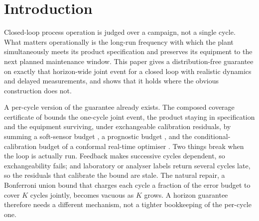 \section{Introduction}
\label{sec:intro}

Closed-loop process operation is judged over a campaign, not a single cycle. What matters
operationally is the long-run frequency with which the plant simultaneously meets its product
specification and preserves its equipment to the next planned maintenance window. This paper
gives a distribution-free guarantee on exactly that horizon-wide joint event for a closed loop
with realistic dynamics and delayed measurements, and shows that it holds where the obvious
construction does not.

A per-cycle version of the guarantee already exists. The composed coverage certificate of
\citet{busico_m4} bounds the one-cycle joint event, the product staying in specification and
the equipment surviving, under exchangeable calibration residuals, by summing a soft-sensor
budget \citep{busico_m1}, a prognostic budget \citep{busico_m2}, and the conditional-calibration
budget of a conformal real-time optimiser \citep{busico_m3}. Two things break when the loop is
actually run. Feedback makes successive cycles dependent, so exchangeability fails; and
laboratory or analyser labels return several cycles late, so the residuals that calibrate the
bound are stale. The natural repair, a Bonferroni union bound that charges each cycle a fraction
of the error budget to cover $K$ cycles jointly, becomes vacuous as $K$ grows. A horizon
guarantee therefore needs a different mechanism, not a tighter bookkeeping of the per-cycle one.

